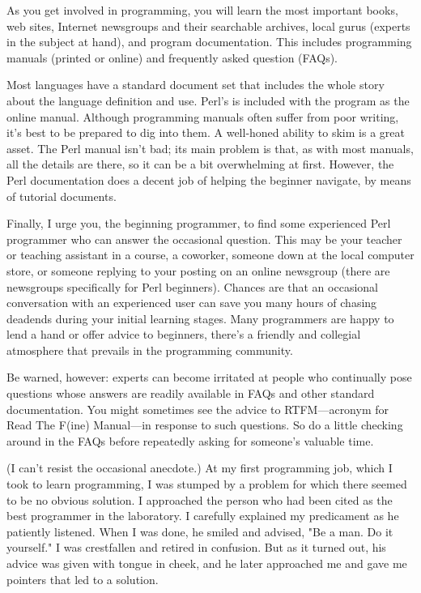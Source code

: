 As you get involved in programming, you will learn the most important books, web sites, Internet newsgroups and their searchable archives, local gurus (experts in the subject at hand), and program documentation.  This includes programming manuals (printed or online) and frequently asked question (FAQs).

Most languages have a standard document set that includes the whole story about the language definition and use. Perl's is included with the program as the online manual. Although programming manuals often suffer from poor writing, it's best to be prepared to dig into them. A well-honed ability to skim is a great asset. The Perl manual isn't bad; its main problem is that, as with most manuals, all the details are there, so it can be a bit overwhelming at first. However, the Perl documentation does a decent job of helping the beginner navigate, by means of tutorial documents.

Finally, I urge you, the beginning programmer, to find some experienced Perl programmer who can answer the occasional question. This may be your teacher or teaching assistant in a course, a coworker, someone down at the local computer store, or someone replying to your posting on an online newsgroup (there are newsgroups specifically for Perl beginners).  Chances are that an occasional conversation with an experienced user can save you many hours of chasing deadends during your initial learning stages. Many programmers are happy to lend a hand or offer advice to beginners, there's a friendly and collegial atmosphere that prevails in the programming community.

Be warned, however: experts can become irritated at people who continually pose questions whose answers are readily available in FAQs and other standard documentation. You might sometimes see the advice to RTFM—acronym for Read The F(ine) Manual—in response to such questions.  So do a little checking around in the FAQs before repeatedly asking for someone's valuable time.

(I can't resist the occasional anecdote.) At my first programming job, which I took to learn programming, I was stumped by a problem for which there seemed to be no obvious solution. I approached the person who had been cited as the best programmer in the laboratory. I carefully explained my predicament as he patiently listened. When I was done, he smiled and advised, "Be a man. Do it yourself." I was crestfallen and retired in confusion. But as it turned out, his advice was given with tongue in cheek, and he later approached me and gave me pointers that led to a solution. 
